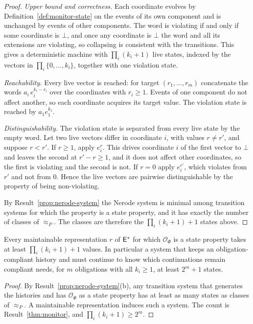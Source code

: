\begin{proof}
\emph{Upper bound and correctness.} Each coordinate evolves by Definition~\ref{def:monitor-state} on the events of its own component and is unchanged by events of other components. The word is violating if and only if some coordinate is $\bot$, and once any coordinate is $\bot$ the word and all its extensions are violating, so collapsing is consistent with the transitions. This gives a deterministic machine with $\prod_i(k_i+1)$ live states, indexed by the vectors in $\prod_i\{0,\dots,k_i\}$, together with one violation state.

\emph{Reachability.} Every live vector is reached: for target $(r_1,\dots,r_m)$ concatenate the words $a_i\,e_i^{k_i-r_i}$ over the coordinates with $r_i\ge1$. Events of one component do not affect another, so each coordinate acquires its target value. The violation state is reached by $a_1e_1^{k_1}$.

\emph{Distinguishability.} The violation state is separated from every live state by the empty word. Let two live vectors differ in coordinate $i$, with values $r\ne r'$, and suppose $r<r'$. If $r\ge1$, apply $e_i^{r}$. This drives coordinate $i$ of the first vector to $\bot$ and leaves the second at $r'-r\ge1$, and it does not affect other coordinates, so the first is violating and the second is not. If $r=0$ apply $e_i^{r'}$, which violates from $r'$ and not from $0$. Hence the live vectors are pairwise distinguishable by the property of being non-violating.

By Result~\ref{prop:nerode-system} the Nerode system is minimal among transition systems for which the property is a state property, and it has exactly the number of classes of $\approx_P$. The classes are therefore the $\prod_i(k_i+1)+1$ states above.
\end{proof}

\begin{newresult}\label{prop:monitor-lower}
Every maintainable representation $r$ of $\mathsf{E}^{*}$ for which $\mathcal O_\Phi$ is a state property takes at least $\prod_i(k_i+1)+1$ values. In particular a system that keeps an obligation-compliant history and must continue to know which continuations remain compliant needs, for $m$ obligations with all $k_i\ge1$, at least $2^{m}+1$ states.
\end{newresult}
\begin{proof}
By Result~\ref{prop:nerode-system}(b), any transition system that generates the histories and has $\mathcal O_\Phi$ as a state property has at least as many states as classes of $\approx_P$. A maintainable representation induces such a system. The count is Result~\ref{thm:monitor}, and $\prod_i(k_i+1)\ge2^{m}$.
\end{proof}

